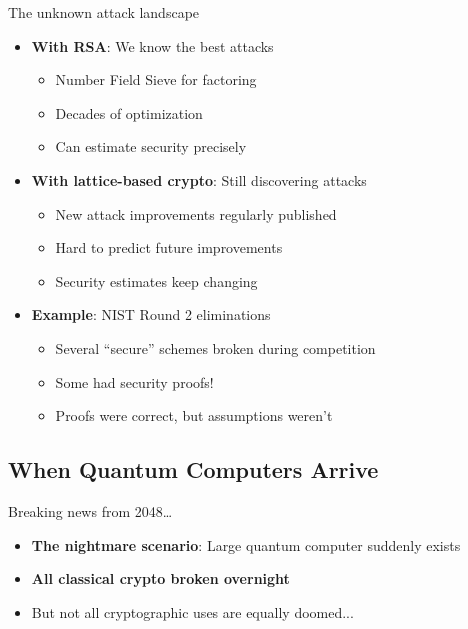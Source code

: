 \documentclass[aspectratio=169, lualatex, handout]{beamer}
\begin{document}
\begin{frame}{The unknown attack landscape}
	\begin{itemize}
		\item \textbf{With RSA}: We know the best attacks
		      \begin{itemize}
			      \item Number Field Sieve for factoring
			      \item Decades of optimization
			      \item Can estimate security precisely
		      \end{itemize}
		\item \textbf{With lattice-based crypto}: Still discovering attacks
		      \begin{itemize}
			      \item New attack improvements regularly published
			      \item Hard to predict future improvements
			      \item Security estimates keep changing
		      \end{itemize}
		\item \textbf{Example}: NIST Round 2 eliminations
		      \begin{itemize}
			      \item Several ``secure'' schemes broken during competition
			      \item Some had security proofs!
			      \item Proofs were correct, but assumptions weren't
		      \end{itemize}
	\end{itemize}
\end{frame}

\subsection{When Quantum Computers Arrive}

\begin{frame}{Breaking news from 2048\ldots}
	\begin{itemize}
		\item \textbf{The nightmare scenario}: Large quantum computer suddenly exists
		\item \textbf{All classical crypto broken overnight}
		\item But not all cryptographic uses are equally doomed...
	\end{itemize}
\end{frame}
\end{document}
